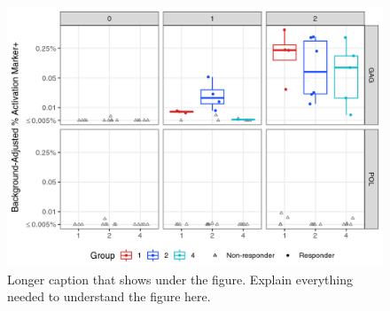 \documentclass[11pt]{article}
\begin{document}
\begin{figure}[H]

{\centering \includegraphics[width=1\linewidth,]{HVTN_Workshop_Example_files/figure-latex/example-plot-1} 

}

\caption[Shorter caption for List of Figures.]{Longer caption that shows under the figure. Explain everything needed to understand the figure here.}\label{fig:example-plot}
\end{figure}

\clearpage
\end{document}
